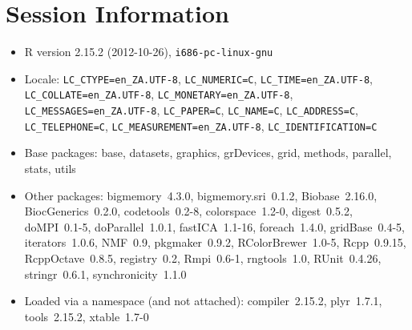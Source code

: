 \documentclass[10pt]{article}
\begin{document}
\section*{Session Information}
\begin{itemize}\raggedright
  \item R version 2.15.2 (2012-10-26), \verb|i686-pc-linux-gnu|
  \item Locale: \verb|LC_CTYPE=en_ZA.UTF-8|, \verb|LC_NUMERIC=C|, \verb|LC_TIME=en_ZA.UTF-8|, \verb|LC_COLLATE=en_ZA.UTF-8|, \verb|LC_MONETARY=en_ZA.UTF-8|, \verb|LC_MESSAGES=en_ZA.UTF-8|, \verb|LC_PAPER=C|, \verb|LC_NAME=C|, \verb|LC_ADDRESS=C|, \verb|LC_TELEPHONE=C|, \verb|LC_MEASUREMENT=en_ZA.UTF-8|, \verb|LC_IDENTIFICATION=C|
  \item Base packages: base, datasets, graphics, grDevices, grid,
    methods, parallel, stats, utils
  \item Other packages: bigmemory~4.3.0, bigmemory.sri~0.1.2,
    Biobase~2.16.0, BiocGenerics~0.2.0, codetools~0.2-8,
    colorspace~1.2-0, digest~0.5.2, doMPI~0.1-5, doParallel~1.0.1,
    fastICA~1.1-16, foreach~1.4.0, gridBase~0.4-5, iterators~1.0.6,
    NMF~0.9, pkgmaker~0.9.2, RColorBrewer~1.0-5, Rcpp~0.9.15,
    RcppOctave~0.8.5, registry~0.2, Rmpi~0.6-1, rngtools~1.0,
    RUnit~0.4.26, stringr~0.6.1, synchronicity~1.1.0
  \item Loaded via a namespace (and not attached): compiler~2.15.2,
    plyr~1.7.1, tools~2.15.2, xtable~1.7-0
\end{itemize}
\end{document}
